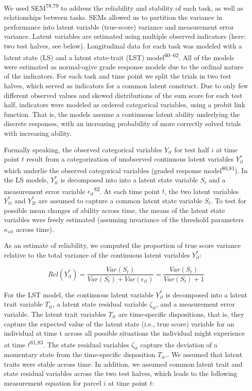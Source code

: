 \documentclass[
  man,floatsintext]{apa6}
\begin{document}
We used SEM\textsuperscript{78,79} to address the reliability and stability of each task, as well as relationships between tasks. SEMs allowed us to partition the variance in performance into latent variable (true-score) variance and measurement error variance. Latent variables are estimated using multiple observed indicators (here: two test halves, see below). Longitudinal data for each task was modeled with a latent state (LS) and a latent state-trait (LST) model\textsuperscript{60--62}. All of the models were estimated as normal-ogive grade response models due to the ordinal nature of the indicators. For each task and time point we split the trials in two test halves, which served as indicators for a common latent construct. Due to only few different observed values and skewed distributions of the sum score for each test half, indicators were modeled as ordered categorical variables, using a probit link function. That is, the models assume a continuous latent ability underlying the discrete responses, with an increasing probability of more correctly solved trials with increasing ability.

Formally speaking, the observed categorical variables \(Y_{it}\) for test half \(i\) at time point \(t\) result from a categorization of unobserved continuous latent variables \(Y^*_{it}\) which underlie the observed categorical variables (graded response model\textsuperscript{80,81}). In the LS models, \(Y^*_{it}\) is decomposed into into a latent state variable \(S_t\) and a measurement error variable \(\epsilon_{it}\)\textsuperscript{82}. At each time point \(t\), the two latent variables \(Y^*_{1t}\) and \(Y^*_{2t}\) are assumed to capture a common latent state variable \(S_t\). To test for possible mean changes of ability across time, the means of the latent state variables were freely estimated (assuming invariance of the threshold parameters \(\kappa_{sit}\) across time).

As an estimate of reliability, we computed the proportion of true score variance relative to the total variance of the continuous latent variables \(Y^*_{it}\):

\begin{equation}
Rel(Y^*_{it})=\frac{Var(S_t)}{Var(S_t)+Var(\epsilon_{it})}=\frac{Var(S_t)}{Var(S_t)+1}
\end{equation}

For the LST model, the continuous latent variable \(Y^*_{it}\) is decomposed into a latent trait variable \(T_{it}\), a latent state residual variable \(\zeta_{it}\), and a measurement error variable. The latent trait variables \(T_{it}\) are time-specific dispositions, that is, they capture the expected value of the latent state (i.e., true score) variable for an individual at time t across all possible situations the individual might experience at time \(t\)\textsuperscript{61,83}. The state residual variables \(\zeta_{it}\) capture the deviation of a momentary state from the time-specific disposition \(T_{it}\).. We assumed that latent traits were stable across time. In addition, we assumed common latent trait and state residual variables across the two test halves, which leads to the following measurement equation for parcel \(i\) at time point \(t\):
\end{document}

